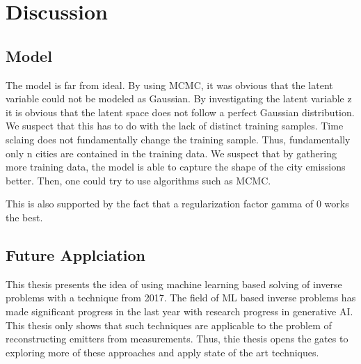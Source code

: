 
\chapter{Discussion}\label{chapter:discussion}

\section{Model}
The model is far from ideal.
By using MCMC, it was obvious that the latent variable could not be modeled as Gaussian.
By investigating the latent variable z it is obvious that the latent space does not follow a perfect Gaussian distribution.
We suspect that this has to do with the lack of distinct training samples.
Time sclaing does not fundamentally change the training sample.
Thus, fundamentally only n cities are contained in the training data.
We suspect that by gathering more training data, the model is able to capture the shape of the city emissions better.
Then, one could try to use algorithms such as MCMC.

This is also supported by the fact that a regularization factor \gls{gamma} of 0 works the best.

\section{Future Applciation}
This thesis presents the idea of using machine learning based solving of inverse problems with a technique from 2017.
The field of ML based inverse problems has made significant progress in the last year with research progress in generative AI.
This thesis only shows that such techniques are applicable to the problem of reconstructing emitters from measurements.
Thus, thie thesis opens the gates to exploring more of these approaches and apply state of the art techniques.
